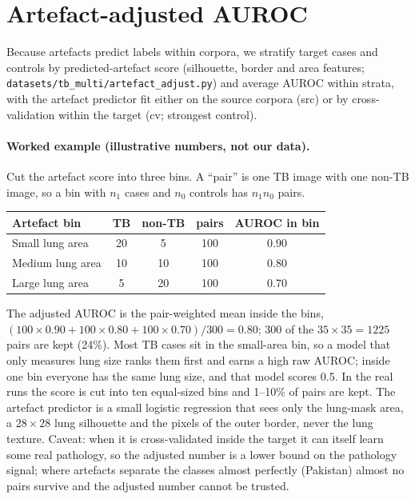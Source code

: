 \documentclass[10pt,a4paper]{article}
\begin{document}
\section{Artefact-adjusted AUROC}
Because artefacts predict labels within corpora, we stratify target cases and controls by predicted-artefact score (silhouette, border and area features; \texttt{datasets/tb\_multi/artefact\_adjust.py}) and average AUROC within strata, with the artefact predictor fit either on the source corpora (src) or by cross-validation within the target (cv; strongest control). \paragraph{Worked example (illustrative numbers, not our data).} Cut the artefact score into three bins. A ``pair'' is one TB image with one non-TB image, so a bin with $n_1$ cases and $n_0$ controls has $n_1 n_0$ pairs.
\begin{table}[H]\centering\small
\begin{tabular}{lcccc}\toprule
Artefact bin & TB & non-TB & pairs & AUROC in bin\\\midrule
Small lung area & 20 & 5 & 100 & 0.90\\
Medium lung area & 10 & 10 & 100 & 0.80\\
Large lung area & 5 & 20 & 100 & 0.70\\\bottomrule
\end{tabular}\end{table}
The adjusted AUROC is the pair-weighted mean inside the bins, $(100\times0.90+100\times0.80+100\times0.70)/300=0.80$; 300 of the $35\times35=1225$ pairs are kept (24\%). Most TB cases sit in the small-area bin, so a model that only measures lung size ranks them first and earns a high raw AUROC; inside one bin everyone has the same lung size, and that model scores 0.5. In the real runs the score is cut into ten equal-sized bins and 1--10\% of pairs are kept. The artefact predictor is a small logistic regression that sees only the lung-mask area, a $28\times28$ lung silhouette and the pixels of the outer border, never the lung texture. Caveat: when it is cross-validated inside the target it can itself learn some real pathology, so the adjusted number is a lower bound on the pathology signal; where artefacts separate the classes almost perfectly (Pakistan) almost no pairs survive and the adjusted number cannot be trusted.
\end{document}
